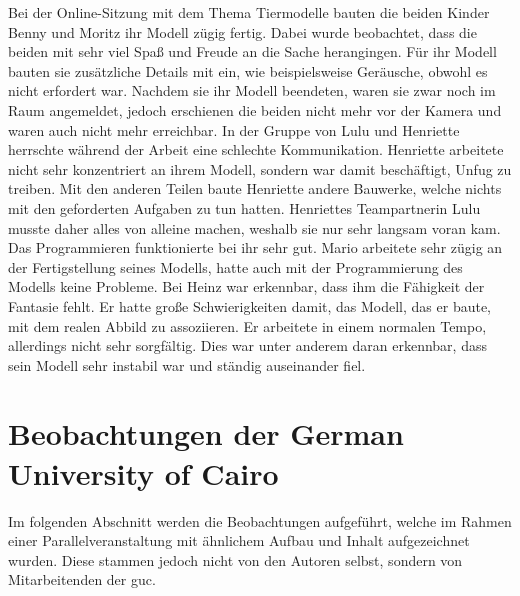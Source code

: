 Bei der Online-Sitzung mit dem Thema Tiermodelle  bauten die beiden Kinder Benny und Moritz ihr Modell zügig fertig. Dabei wurde beobachtet, dass die beiden mit sehr viel Spaß und Freude an die Sache herangingen. Für ihr Modell bauten sie zusätzliche Details mit ein, wie beispielsweise Geräusche, obwohl es nicht erfordert war. Nachdem sie ihr Modell beendeten, waren sie zwar noch im Raum angemeldet, jedoch erschienen die beiden nicht mehr vor der Kamera und waren auch nicht mehr erreichbar. In der Gruppe von Lulu und Henriette herrschte während der Arbeit eine schlechte Kommunikation. Henriette arbeitete nicht sehr konzentriert an ihrem Modell, sondern war damit beschäftigt, Unfug zu treiben. Mit den anderen Teilen baute Henriette andere Bauwerke, welche nichts mit den geforderten Aufgaben zu tun hatten. Henriettes Teampartnerin Lulu musste daher alles von alleine machen, weshalb sie nur sehr langsam voran kam. Das Programmieren funktionierte bei ihr sehr gut. Mario arbeitete sehr zügig an der Fertigstellung seines Modells, hatte auch mit der Programmierung des Modells keine Probleme. Bei Heinz war erkennbar, dass ihm die Fähigkeit der Fantasie fehlt. Er hatte große Schwierigkeiten damit, das Modell, das er baute, mit dem realen Abbild zu assoziieren. Er arbeitete in einem normalen Tempo, allerdings nicht sehr sorgfältig. Dies war unter anderem daran erkennbar, dass sein Modell sehr instabil war und ständig auseinander fiel.

\section{Beobachtungen der German University of Cairo}
Im folgenden Abschnitt werden die Beobachtungen aufgeführt, welche im Rahmen einer Parallelveranstaltung mit ähnlichem Aufbau und Inhalt aufgezeichnet wurden. Diese stammen jedoch nicht von den Autoren selbst, sondern von Mitarbeitenden der \acrlong{guc}.\\

